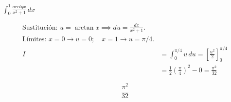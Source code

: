 $\displaystyle \int_{0}^{1}\frac{arctg x}{x^2+1}\,dx$

\nopagebreak
\begin{align*}
\text{Sustitución: } u = \arctan x \implies du = \frac{dx}{x^2+1}. \\
\text{Límites: } x=0 \to u=0; \quad x=1 \to u=\pi/4. \\
I &= \int_{0}^{\pi/4} u \, du = \left[ \frac{u^2}{2} \right]_{0}^{\pi/4} \\
&= \frac{1}{2} \left(\frac{\pi}{4}\right)^2 - 0 = \frac{\pi^2}{32}
\end{align*}

\[
\boxed{\displaystyle \frac{\pi^2}{32}}
\]
